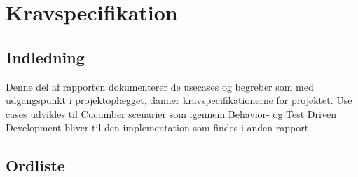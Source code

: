 \section{Kravspecifikation}
\subsection{Indledning}
Denne del af rapporten dokumenterer de usecases og begreber som med udgangspunkt i projektoplægget, danner kravspecifikationerne for projektet. Use cases udvikles til Cucumber scenarier som igennem Behavior- og Test Driven Development bliver til den implementation som findes i anden rapport.
\subsection{Ordliste}
